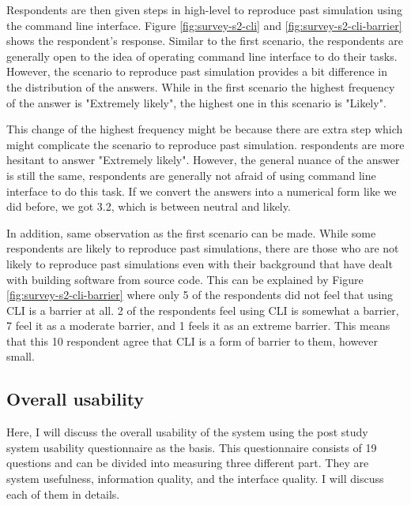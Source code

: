 \vspace{0.5cm}

Respondents are then given steps in high-level to reproduce past simulation using the command line interface.  Figure \ref{fig:survey-s2-cli} and \ref{fig:survey-s2-cli-barrier} shows the respondent's response. Similar to the first scenario, the respondents are generally open to the idea of operating command line interface to do their tasks. However, the scenario to reproduce past simulation provides a bit difference in the distribution of the answers. While in the first scenario the highest frequency of the answer is "Extremely likely", the highest one in this scenario is "Likely". 

This change of the highest frequency might be because there are extra step which might complicate the scenario to reproduce past simulation. respondents are more hesitant to answer "Extremely likely". However, the general nuance of the answer is still the same, respondents are generally not afraid of using command line interface to do this task. If we convert the answers into a numerical form like we did before, we got 3.2, which is between neutral and likely. 

In addition, same observation as the first scenario can be made. While some respondents are likely to reproduce past simulations, there are those who are not likely to reproduce past simulations even with their background that have dealt with building software from source code. This can be explained by Figure \ref{fig:survey-s2-cli-barrier} where only 5 of the respondents did not feel that using CLI is a barrier at all. 2 of the respondents feel using CLI is somewhat a barrier, 7 feel it as a moderate barrier, and  1 feels it as an extreme barrier. This means that this 10 respondent agree that CLI is a form of barrier to them, however small.


\subsection{Overall usability}


Here, I will discuss the overall usability of the system using the post study system usability questionnaire as the basis. This questionnaire consists of 19 questions and can be divided into measuring three different part. They are system usefulness, information quality, and the interface quality. I will discuss each of them in details.


